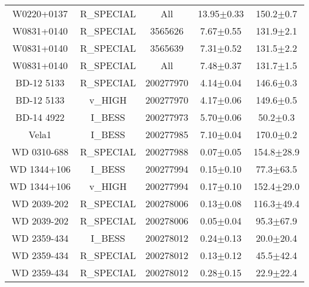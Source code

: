 \begin{table}
\begin{tabular}{ccccc}
W0220+0137 & R_SPECIAL & All & 13.95$\pm$0.33 & 150.2$\pm$0.7 \\
W0831+0140 & R_SPECIAL & 3565626 & 7.67$\pm$0.55 & 131.9$\pm$2.1 \\
W0831+0140 & R_SPECIAL & 3565639 & 7.31$\pm$0.52 & 131.5$\pm$2.2 \\
W0831+0140 & R_SPECIAL & All & 7.48$\pm$0.37 & 131.7$\pm$1.5 \\
BD-12 5133 & R_SPECIAL & 200277970 & 4.14$\pm$0.04 & 146.6$\pm$0.3 \\
BD-12 5133 & v_HIGH & 200277970 & 4.17$\pm$0.06 & 149.6$\pm$0.5 \\
BD-14 4922 & I_BESS & 200277973 & 5.70$\pm$0.06 & 50.2$\pm$0.3 \\
Vela1 & I_BESS & 200277985 & 7.10$\pm$0.04 & 170.0$\pm$0.2 \\
WD 0310-688 & R_SPECIAL & 200277988 & 0.07$\pm$0.05 & 154.8$\pm$28.9 \\
WD 1344+106 & I_BESS & 200277994 & 0.15$\pm$0.10 & 77.3$\pm$63.5 \\
WD 1344+106 & v_HIGH & 200277994 & 0.17$\pm$0.10 & 152.4$\pm$29.0 \\
WD 2039-202 & R_SPECIAL & 200278006 & 0.13$\pm$0.08 & 116.3$\pm$49.4 \\
WD 2039-202 & R_SPECIAL & 200278006 & 0.05$\pm$0.04 & 95.3$\pm$67.9 \\
WD 2359-434 & I_BESS & 200278012 & 0.24$\pm$0.13 & 20.0$\pm$20.4 \\
WD 2359-434 & R_SPECIAL & 200278012 & 0.13$\pm$0.12 & 45.5$\pm$42.4 \\
WD 2359-434 & R_SPECIAL & 200278012 & 0.28$\pm$0.15 & 22.9$\pm$22.4 \\
\end{tabular}
\end{table}
